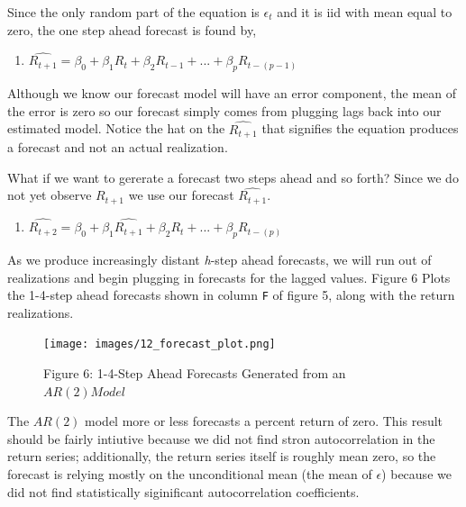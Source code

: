 \documentclass[
  letterpaper,
  DIV=11,
  numbers=noendperiod]{scrreprt}
\providecommand{\tightlist}{%
  \setlength{\itemsep}{0pt}\setlength{\parskip}{0pt}}\usepackage{longtable,booktabs,array}
\begin{document}
Since the only random part of the equation is \(\epsilon_t\) and it is
iid with mean equal to zero, the one step ahead forecast is found by,

\begin{enumerate}
\def\labelenumi{\arabic{enumi}.}
\setcounter{enumi}{3}
\tightlist
\item
  \(\hat{R_{t+1}} = \beta_0 + \beta_1R_{t} + \beta_2R_{t-1}+ ... + \beta_{p}R_{t-(p-1)}\)
\end{enumerate}

Although we know our forecast model will have an error component, the
mean of the error is zero so our forecast simply comes from plugging
lags back into our estimated model. Notice the hat on the
\(\hat{R_{t+1}}\) that signifies the equation produces a forecast and
not an actual realization.

What if we want to gererate a forecast two steps ahead and so forth?
Since we do not yet observe \(R_{t+1}\) we use our forecast
\(\hat{R_{t+1}}\).

\begin{enumerate}
\def\labelenumi{\arabic{enumi}.}
\setcounter{enumi}{4}
\tightlist
\item
  \(\hat{R_{t+2}} = \beta_0 + \beta_1\hat{R_{t+1}} + \beta_2R_{t}+ ... + \beta_{p}R_{t-(p)}\)
\end{enumerate}

As we produce increasingly distant \emph{h}-step ahead forecasts, we
will run out of realizations and begin plugging in forecasts for the
lagged values. Figure 6 Plots the 1-4-step ahead forecasts shown in
column \texttt{F} of figure 5, along with the return realizations.

\begin{figure}

{\centering \texttt{[image: images/12\_forecast\_plot.png]}

}

\caption{Figure 6: 1-4-Step Ahead Forecasts Generated from an
\(AR(2) Model\)}

\end{figure}

The \(AR(2)\) model more or less forecasts a percent return of zero.
This result should be fairly intiutive because we did not find stron
autocorrelation in the return series; additionally, the return series
itself is roughly mean zero, so the forecast is relying mostly on the
unconditional mean (the mean of \(\epsilon\)) because we did not find
statistically siginificant autocorrelation coefficients.
\end{document}
